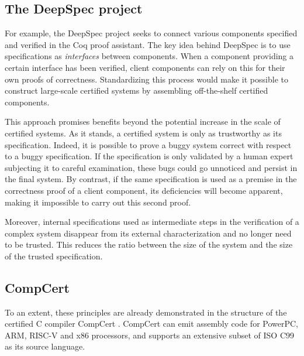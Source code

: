 \documentclass[11pt,oneside]{book}
\theoremstyle{definition}
\begin{document}

\subsection{The DeepSpec project} %

For example, the DeepSpec project \citep{deepspec}
seeks to connect various components
specified and verified in the Coq proof assistant.
The key idea behind DeepSpec
is to use specifications as \emph{interfaces}
between components.
When a component providing a certain interface
has been verified,
client components can rely on this
for their own proofs of correctness.
Standardizing this process would make it possible
to construct large-scale certified systems
by assembling off-the-shelf certified components.

This approach promises benefits
beyond the potential increase in the scale of
certified systems.
As it stands,
a certified system is only
as trustworthy as its specification.
Indeed,
it is possible to prove a buggy system correct
with respect to a buggy specification.
If the specification is only validated by
a human expert subjecting it to careful examination,
these bugs could go unnoticed
and persist in the final system.
By contrast,
if the same specification is used as a premise
in the correctness proof of a client component,
its deficiencies will become apparent,
making it impossible to carry out this second proof.

Moreover,
internal specifications used
as intermediate steps
in the verification of a complex system
disappear from its external characterization
and no longer need to be trusted.
This reduces the ratio between the size of the system
and the size of the trusted specification.


\subsection{CompCert} %

To an extent,
these principles are already demonstrated in the structure of the
certified C compiler CompCert \citep{compcert}.
CompCert can emit assembly code
for PowerPC, ARM, RISC-V and x86 processors,
and supports an extensive subset of ISO C99
as its source language.
\end{document}
